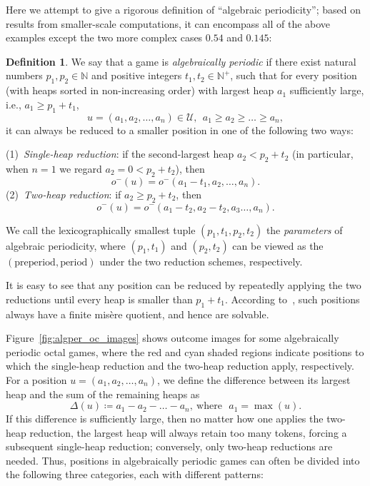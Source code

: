 \documentclass[11pt]{article}
\theoremstyle{definition}
\newtheorem{definition}{Definition}[section]
\theoremstyle{plain}
\newcommand{\varU}{\mathcal{U}}
\begin{document}
Here we attempt to give a rigorous definition of ``algebraic periodicity''; based on results from smaller-scale computations, it can encompass all of the above examples except the two more complex cases $\mathbf{0.54}$ and $\mathbf{0.145}$:

\begin{definition}

    We say that a game is \textit{algebraically periodic} if there exist natural numbers $p_1, p_2\in\mathbb{N}$ and positive integers $t_1, t_2\in\mathbb{N}^+$,
    such that for every position (with heaps sorted in non-increasing order) with largest heap $a_1$ sufficiently large, i.e., $a_1\geq p_1+t_1$,
    \[
         u=(a_1, a_2, \ldots, a_n)\in\varU,~~ a_1\geq a_2\geq \ldots \geq a_n,
    \]
    it can always be reduced to a smaller position in one of the following two ways:

    (1)~\textit{Single-heap reduction}: if the second-largest heap $a_2 < p_2+t_2$ (in particular, when $n=1$ we regard $a_2=0 < p_2+t_2$), then
    \[
        o^-(u)=o^-(a_1-t_1, a_2, \ldots, a_n).
    \]
    (2)~\textit{Two-heap reduction}: if $a_2 \geq p_2+t_2$, then
    \[
        o^-(u)=o^-(a_1-t_2, a_2-t_2, a_3 \ldots, a_n).
    \]

    We call the lexicographically smallest tuple $(p_1, t_1, p_2, t_2)$ the \textit{parameters} of algebraic periodicity,
    where $(p_1, t_1)$ and $(p_2, t_2)$ can be viewed as the $(\text{preperiod}, \text{period})$ under the two reduction schemes, respectively.
\end{definition}

It is easy to see that any position can be reduced by repeatedly applying the two reductions until every heap is smaller than $p_1+t_1$.
According to~\cite{MisQuot2006}, such positions always have a finite misère quotient, and hence are solvable.

Figure~\ref{fig:algper_oc_images} shows outcome images for some algebraically periodic octal games, where the red and cyan shaded regions indicate positions to which the single-heap reduction and the two-heap reduction apply, respectively.
For a position $u=(a_1, a_2, \ldots, a_n)$, we define the difference between its largest heap and the sum of the remaining heaps as
\[
    \Delta(u) \coloneq a_1-a_2-\ldots-a_n,\ \text{where~~}a_1=\max(u).
\]
If this difference is sufficiently large, then no matter how one applies the two-heap reduction, the largest heap will always retain too many tokens, forcing a subsequent single-heap reduction;
conversely, only two-heap reductions are needed.
Thus, positions in algebraically periodic games can often be divided into the following three categories, each with different patterns:
\end{document}
